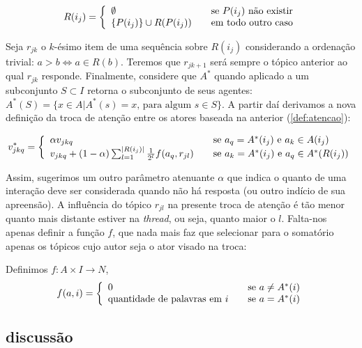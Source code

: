 \documentclass{article}
\begin{document}
\begin{equation}
R(i_j) = \left\{ \begin{array}{l l} \emptyset &\quad\text{se $P(i_j)$ não
existir}\\ \{P(i_j)\} \cup R(P(i_j)) &\quad\text{em todo outro caso}\end{array}
\right.
\end{equation}

Seja $r_{jk}$ o $k$-ésimo item de uma sequência sobre $R(i_j)$ considerando a
ordenação trivial: $a > b \iff a\in R(b)$. Teremos que $r_{jk+1}$ será sempre o
tópico anterior ao qual $r_{jk}$ responde. Finalmente, considere que $A^*$
quando aplicado a um subconjunto $S \subset I$ retorna o subconjunto de seus
agentes: $A^*(S)=\{x \in A| A^*(s) = x \text{, para algum }s \in S\}$. A
partir daí derivamos a nova definição da troca de atenção entre os atores baseada na anterior
(\ref{def:atencao}):

\begin{equation}
	v_{jkq}^* = \left\{
	\begin{array}{l l}
		\alpha v_{jkq} & \quad \text{se $a_q=A^*(i_j)$ e $a_k \in A(i_j)$} \\
		v_{jkq} + (1-\alpha)\sum_{l=1}^{|R(i_j)|}\frac{1}{2^l}f(a_q, r_{jl}) & \quad
		\text{se $a_k=A^*(i_j)$ e $a_q \in A^*(R(i_j))$} 
	\end{array}
	\right.
\end{equation}

Assim, sugerimos um outro parâmetro atenuante $\alpha$ que indica o quanto de
uma interação deve ser considerada quando não há resposta (ou outro indício de
sua apreensão). A influência do tópico $r_{jl}$ na presente troca de atenção é
tão menor quanto mais distante estiver na \textit{thread}, ou seja, quanto maior
o $l$. Falta-nos apenas definir a função $f$, que nada mais faz que selecionar
para o somatório apenas os tópicos cujo autor seja o ator visado na troca:

Definimos $f:A\times I\to N$,
\begin{equation}
		f(a,i) = \left\{
		\begin{array}{l l}
			0 & \quad \text{se $a\neq A^*(i)$}\\
			\text{quantidade de palavras em }i & \quad \text{se $a=A^*(i)$}
		\end{array}\right.
\end{equation}
\subsection{discussão}
\end{document}
